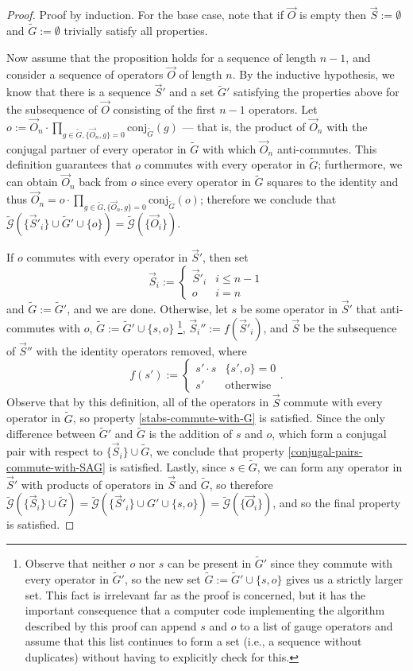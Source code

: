 \documentclass{amsbook}
\theoremstyle{plain}
\theoremstyle{definition}
\theoremstyle{remark}
\newcommand{\lst}{\vec}
\newcommand{\set}{\tilde}
\newcommand{\genfun}{\tilde{\mathcal{G}}}
\newcommand{\paren}[1]{\left(#1\right)}
\begin{document}
\begin{proof}
Proof by induction.  For the base case, note that if $\lst O$ is empty then $\lst S:=\emptyset$ and $\set G:=\emptyset$ trivially satisfy all properties.

Now assume that the proposition holds for a sequence of length $n-1$, and consider a sequence of operators $\lst O$ of length $n$.  By the inductive hypothesis, we know that there is a sequence $\lst S'$ and a set $\set G'$ satisfying the properties above for the subsequence of $\lst O$ consisting of the first $n-1$ operators.  Let $o:=\lst O_n\cdot \prod_{g\in \set G, \{\lst O_n,g\}=0} \text{conj}_{\set G}(g)$ --- that is, the product of $\lst O_n$ with the conjugal partner of every operator in $\set G$ with which $\lst O_n$ anti-commutes.  This definition guarantees that $o$ commutes with every operator in $\set G$;  furthermore, we can obtain $\lst O_n$ back from $o$ since every operator in $\set G$ squares to the identity and thus $\lst O_n=o\cdot \prod_{g\in \set G, \{\lst O_n,g\}=0} \text{conj}_{\set G}(o)$; therefore we conclude that $\genfun\paren{\{\lst S'_i\} \cup \set G' \cup \{o\}}=\genfun\paren{\{\lst O_i\}}$.

If $o$ commutes with every operator in $\lst S'$, then set
$$\lst S_i :=
\begin{cases}
\lst S'_i & i \le n-1 \\
o & i = n
\end{cases}
$$
and $\set G := \set G'$, and we are done.  Otherwise, let $s$ be some operator in $\lst S'$ that anti-commutes with $o$, $\set G:=\set G'\cup \{s,o\}$
\footnote{Observe that neither $o$ nor $s$ can be present in $\set G'$ since they commute with every operator in $\set G'$, so the new set $\set G:=\set G'\cup \{s,o\}$ gives us a strictly larger set.  This fact is irrelevant far as the proof is concerned, but it has the important consequence that a computer code implementing the algorithm described by this proof can append $s$ and $o$ to a list of gauge operators and assume that this list continues to form a set (i.e., a sequence without duplicates) without having to explicitly check for this.}, $\lst S_i'' := f(\lst S'_i)$, and $\lst S$ be the subsequence of $\lst S''$ with the identity operators removed, where
$$
f(s') :=
\begin{cases}
s'\cdot s & \{s',o\}=0\\
s' & \text{otherwise}
\end{cases}.
$$
Observe that by this definition, all of the operators in $\lst S$ commute with every operator in $\set G$, so property \ref{stabs-commute-with-G} is satisfied.  Since the only difference between $\set G'$ and $\set G$ is the addition of $s$ and $o$, which form a conjugal pair with respect to $\{\lst S_i\} \cup \set G$, we conclude that property \ref{conjugal-pairs-commute-with-SAG} is satisfied.
Lastly, since $s\in \set G$, we can form any operator in $\lst S'$ with products of operators in $\lst S$ and $\set G$, so therefore $\genfun\paren{\{\lst S_i\} \cup \set G}=\genfun\paren{\{\lst S'_i\} \cup G' \cup \{s,o\}}=\genfun\paren{\{\lst O_i\}}$, and so the final property is satisfied.


\end{proof}
\end{document}
